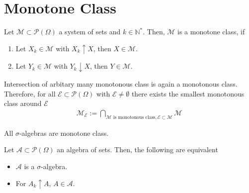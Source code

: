 \section{Monotone Class}
\begin{definition}
    Let \(\mathcal{M} \subset \mathcal{P}(\Omega)\) a system of sets and \(k \in \mathbb{N}^*\). Then, \(\mathcal{M}\) is a monotone class, if
    \begin{enumerate}
        \item Let \(X_k \in \mathcal{M}\) with \(X_k \uparrow X\), then \(X \in \mathcal{M}\).
        \item Let \(Y_k \in \mathcal{M}\) with \(Y_k \downarrow X\), then \(Y \in \mathcal{M}\).
    \end{enumerate}
    Intersection of arbitary many monotonous class is again a monotonous class. Therefore, for all \(\mathcal{E} \subset \mathcal{P}(\Omega)\) with \(\mathcal{E} \neq \emptyset\) there exists the smallest monotonous class around \(\mathcal{E}\)
    \begin{align}
        \mathcal{M}_{\mathcal{E}} := \bigcap_{\mathcal{M} \text{ is monotonous class}, \mathcal{E} \subset \mathcal{M}} \mathcal{M}
    \end{align}
\end{definition}
\begin{remark}
    All \(\sigma\)-algebras are monotone class.
\end{remark}
\begin{theorem}
    Let \(\mathcal{A} \subset \mathcal{P}(\Omega)\) an algebra of sets. Then, the following are equivalent
    \begin{itemize}
        \item \(\mathcal{A}\) is a \(\sigma\)-algebra.
        \item For \(A_k \uparrow A\), \(A \in \mathcal{A}\).
    \end{itemize}
\end{theorem}
%
%
%
%
%

